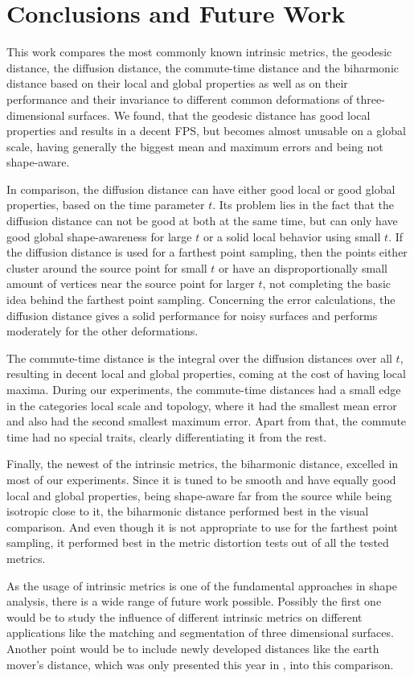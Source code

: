 \chapter{Conclusions and Future Work}
\label{chapter:conclusions}

This work compares the most commonly known intrinsic metrics, the geodesic distance, the diffusion distance, the commute-time distance and the biharmonic distance based on their local and global properties as well as on their performance and their invariance to different common deformations of three-dimensional surfaces.
We found, that the geodesic distance has good local properties and results in a decent FPS, but becomes almost unusable on a global scale, having generally the biggest mean and maximum errors and being not shape-aware.

In comparison, the diffusion distance can have either good local or good global properties, based on the time parameter $t$.
Its problem lies in the fact that the diffusion distance can not be good at both at the same time, but can only have good global shape-awareness for large $t$ or  a solid local behavior using small $t$.
If the diffusion distance is used for a farthest point sampling, then the points either cluster around the source point for small $t$ or have an disproportionally small amount of vertices near the source point for larger $t$, not completing the basic idea behind the farthest point sampling.
Concerning the error calculations, the diffusion distance gives a solid performance for noisy surfaces and performs moderately for the other deformations.

The commute-time distance is the integral over the diffusion distances over all $t$, resulting in decent local and global properties, coming at the cost of having local maxima.
During our experiments, the commute-time distances had a small edge in the categories local scale and topology, where it had the smallest mean error and also had the second smallest maximum error.
Apart from that, the commute time had no special traits, clearly differentiating it from the rest.

Finally, the newest of the intrinsic metrics, the biharmonic distance, excelled in most of our experiments.
Since it is tuned to be smooth and have equally good local and global properties, being shape-aware far from the source while being isotropic close to it, the biharmonic distance performed best in the visual comparison.
And even though it is not appropriate to use for the farthest point sampling, it performed best in the metric distortion tests out of all the tested metrics.

As the usage of intrinsic metrics is one of the fundamental  approaches in shape analysis, there is a wide range of future work possible.
Possibly the first one would be to study the influence of different intrinsic metrics on different applications like the matching and segmentation of three dimensional surfaces.
Another point would be to include newly developed distances like the earth mover's distance, which was only presented this year in \cite{solomon2014earth}, into this comparison.
